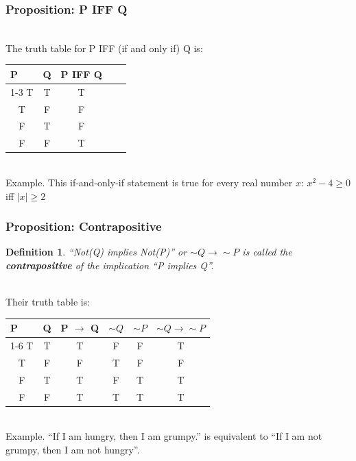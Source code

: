 \documentclass[aspectratio=169, handout]{beamer}
\newtheorem{defn}{Definition}
\numberwithin{equation}{section}
\begin{document}
\begin{frame}
\frametitle{Proposition: P IFF Q}

\ \\The truth table for P IFF (if and only if) Q is:

\begin{table}[]
\begin{tabular}{cccll}
\multicolumn{1}{l}{P} & \multicolumn{1}{l}{Q} & \multicolumn{1}{l}{P IFF Q} &  &  \\ \cline{1-3}
T                     & T                     & T                               &  &  \\
T                     & F                     & F                               &  &  \\
F                     & T                     & F                               &  &  \\
F                     & F                     & T                               &  & 
\end{tabular}
\end{table} \pause

\ \\Example. This if-and-only-if statement is true for every real number $x$: $x^{2} - 4 \geq 0$ iff $|x| \geq 2$

\end{frame}



\begin{frame}
\frametitle{Proposition: Contrapositive}

\begin{defn}
``Not(Q) implies Not(P)'' or  $\sim Q \rightarrow \sim P$ is called the \textbf{contrapositive} of the implication ``P implies Q''. \end{defn} \pause

\ \\Their truth table is:

\begin{table}[]
\begin{tabular}{cc|c|cc|c}
\multicolumn{1}{l}{P} & \multicolumn{1}{l}{Q} & \multicolumn{1}{l}{P $\rightarrow$ Q} & $\sim Q$& $\sim P$& $\sim Q \rightarrow \sim P$   \\ \cline{1-6}
T                     & T                     & T       &     F    &     F          & T                       \\
T                     & F                     & F        &     T     &     F        & F                       \\
F                     & T                     & T          &    F       &    T      & T                       \\
F                     & F                     & T           &    T        &    T    & T                     
\end{tabular}
\end{table} \pause

\ \\Example. ``If I am hungry, then I am grumpy.'' is equivalent to ``If I am not grumpy, then I am not hungry''. 

\end{frame}
\end{document}
